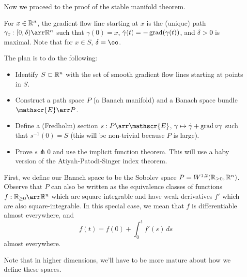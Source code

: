 Now we proceed to the proof of the stable manifold theorem.

For $x \in \mathbb{R}^n$, the gradient flow line starting at $x$ is the (unique) path $\gamma_x:[0,\delta) \arr \R^n$ such that $\gamma(0)=x$, $\dot{\gamma}(t)=-\operatorname{grad}(\gamma(t))$, and $\delta>0$ is maximal. Note that for $x \in S$, $\delta=\oo$.

The plan is to do the following:
\begin{itemize}
\item Identify $S \subset \mathbb{R}^n$ with the set of smooth gradient flow lines starting at points in $S$.

\item Construct a path space $P$ (a Banach manifold) and a Banach space bundle $\mathscr{E} \arr P$.

\item Define a (Fredholm) section $s:P \arr \mathscr{E}$, $\gamma \mapsto \dot{\gamma}+\operatorname{grad} \circ \gamma$ such that $s^{-1}(0)=S$ (this will be non-trivial because $P$ is large).

\item Prove $s \pitchfork 0$ and use the implicit function theorem. This will use a baby version of the Atiyah-Patodi-Singer index theorem.
\end{itemize}
First, we define our Banach space to be the Sobolev space $P=W^{1,2}(\mathbb{R}_{\geq 0},\mathbb{R}^n)$. Observe that $P$ can also be written as the equivalence classes of functions $f:\R_{\geq 0}\arr\R^n$ which are square-integrable and have weak derivatives $f'$ which are also square-integrable. In this special case, we mean that $f$ is differentiable almost everywhere, and 
\[
f(t) = f(0) + \displaystyle\int_0^t f'(s) \, ds
\]
almost everywhere. 

Note that in higher dimensions, we'll have to be more mature about how we define these spaces.

\newpage

